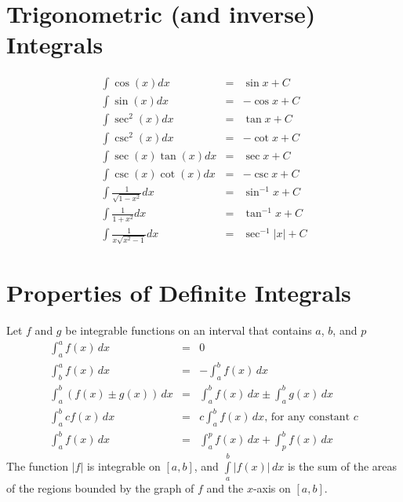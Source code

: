 \documentclass{article}
\begin{document}
\section*{Trigonometric (and inverse) Integrals}
\begin{eqnarray}
    \int{\cos{\left(x\right)}}dx &=& \sin{x} + C \\
    \int{\sin{\left(x\right)}}dx &=& -\cos{x} + C \\
    \int{\sec^2{\left(x\right)}}dx &=& \tan{x} + C \\
    \int{\csc^2{\left(x\right)}}dx &=& -\cot{x} + C \\
    \int{\sec{\left(x\right)}\tan{\left(x\right)}}dx &=& \sec{x} + C \\
    \int{\csc{\left(x\right)}\cot{\left(x\right)}}dx &=& -\csc{x} + C \\
    \int{\frac{1}{\sqrt{1 - x^2}}}dx &=& \sin^{-1}{x} + C \\
    \int{\frac{1}{1 + x^2}}dx &=& \tan^{-1}{x} + C \\
    \int{\frac{1}{x\sqrt{x^2 - 1}}}dx &=& \sec^{-1}{|x|} + C
\end{eqnarray}

\section*{Properties of Definite Integrals}
Let $f$ and $g$ be integrable functions on an interval that contains $a$, $b$, and $p$
\begin{eqnarray}
    \int_a^a{f(x)\,dx} &=& 0 \\
    \int_b^a{f(x)\,dx} &=& -\int_a^b{f(x)\,dx} \\
    \int_a^b{\left(f(x) \pm g(x)\right)\,dx} &=& \int_a^b{f(x)\,dx} \pm \int_a^b{g(x)\,dx} \\
    \int_a^b{cf(x)\,dx} &=& c\int_a^b{f(x)\,dx}\text{, for any constant } c \\
    \int_a^b{f(x)\,dx} &=& \int_a^p{f(x)\,dx} + \int_p^b{f(x)\,dx}
\end{eqnarray}
\hspace{0.5cm} The function $|f|$ is integrable on $[a,b]$, and $\int\limits_a^b{|f(x)|\,dx}$ is the sum of the areas of the regions bounded by the graph of $f$ and the $x$-axis on $[a,b]$.
\end{document}
